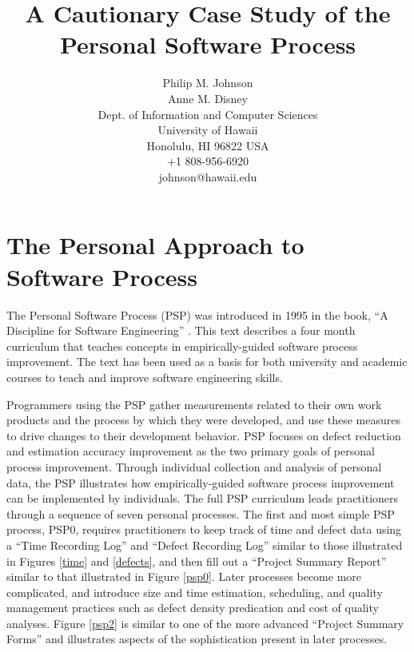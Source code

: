 



\title{A Cautionary Case Study of the Personal Software Process}

\author{Philip M. Johnson\\
        Anne M. Disney\\
        Dept. of Information and Computer Sciences\\
        University of Hawaii\\
        Honolulu, HI  96822 USA\\
        +1 808-956-6920\\
        johnson@hawaii.edu}

\maketitle

\section{The Personal Approach to Software Process}

The Personal Software Process (PSP) was introduced in 1995 in the book, ``A
Discipline for Software Engineering'' \cite{Humphrey95}.  This text
describes a four month curriculum that teaches concepts in
empirically-guided software process improvement. The text has been used 
as a basis for both university and academic courses to
teach and improve software engineering skills. 

Programmers using the PSP gather measurements related to their own work
products and the process by which they were developed, and use these
measures to drive changes to their development behavior.  PSP focuses on
defect reduction and estimation accuracy improvement as the two primary
goals of personal process improvement. Through individual collection and
analysis of personal data, the PSP illustrates how empirically-guided
software process improvement can be implemented by individuals. The full
PSP curriculum leads practitioners through a sequence of seven personal
processes.  The first and most simple PSP process, PSP0, requires practitioners
to keep track of time and defect data using a ``Time Recording Log'' and
``Defect Recording Log'' similar to those illustrated in Figures \ref{time}
and \ref{defects}, and then fill out a ``Project Summary Report'' similar
to that illustrated in Figure \ref{psp0}.  Later processes become more
complicated, and introduce size and time estimation, scheduling, and
quality management practices such as defect density predication and cost of
quality analyses. Figure \ref{psp2} is similar to one of the more
advanced ``Project Summary Forms'' and illustrates aspects of the sophistication
present in later processes.

